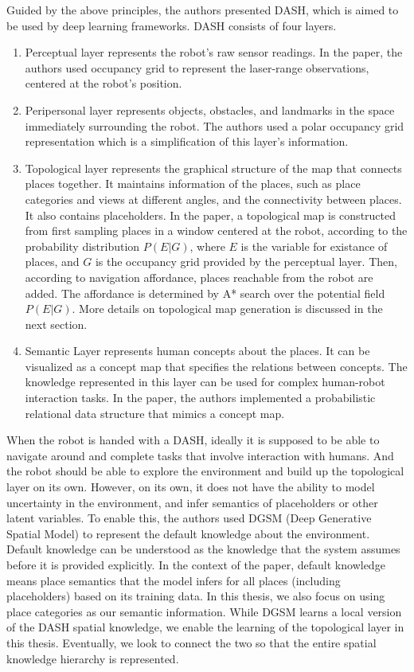 \documentclass[10pt, titlepage]{article}
\theoremstyle{definition}
\begin{document}
\noindent Guided by the above principles, the authors presented DASH, which is aimed to be used by deep learning frameworks. DASH consists of four layers.
\begin{enumerate}[label=(\arabic*)]
    \item Perceptual layer represents the robot's raw sensor readings. In the paper, the authors used occupancy grid to represent the laser-range observations, centered at the robot's position.
    \item Peripersonal layer represents objects, obstacles, and landmarks in the space immediately surrounding the robot. The authors used a polar occupancy grid representation which is a simplification of this layer's information. 
    \item Topological layer represents the graphical structure of the map that connects places together. It maintains information of the places, such as place categories and views at different angles, and the connectivity between places. It also contains placeholders. In the paper, a topological map is constructed from first sampling places in a window centered at the robot, according to the probability distribution $P(E|G)$, where $E$ is the variable for existance of places, and $G$ is the occupancy grid provided by the perceptual layer. Then, according to navigation affordance, places reachable from the robot are added. The affordance is determined by A* search over the potential field $P(E|G)$.  More details on topological map generation is discussed in the next section.
    \item Semantic Layer represents human concepts about the places. It can be visualized as a concept map that specifies the relations between concepts. The knowledge represented in this layer can be used for complex human-robot interaction tasks. In the paper, the authors implemented a probabilistic relational data structure that mimics a concept map.
\end{enumerate}
When the robot is handed with a DASH, ideally it is supposed to be able to navigate around and complete tasks that involve interaction with humans. And the robot should be able to explore the environment and build up the topological layer on its own. However, on its own, it does not have the ability to model uncertainty in the environment, and infer semantics of placeholders or other latent variables. To enable this, the authors used DGSM (Deep Generative Spatial Model) \cite{pronobis2016learning} to represent the default knowledge about the environment. Default knowledge can be understood as the knowledge that the system assumes before it is provided explicitly. In the context of the paper, default knowledge means place semantics that the model infers for all places (including placeholders) based on its training data. In this thesis, we also focus on using place categories as our semantic information. While DGSM learns a local version of the DASH spatial knowledge, we enable the learning of the topological layer in this thesis. Eventually, we look to connect the two so that the entire spatial knowledge hierarchy is represented.
\end{document}
